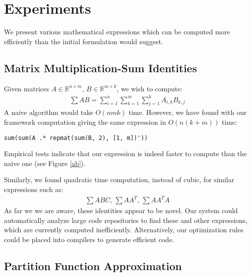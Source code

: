 
\vspace{-2mm}
\section{Experiments}
\vspace{-2mm}

We present various mathematical expressions which can be computed more efficiently
than the initial formulation would suggest. 

\vspace{-2mm}
\subsection{Matrix Multiplication-Sum Identities}

Given matrices $A \in \mathbb{R}^{n \times m}$, $B \in \mathbb{R}^{m
  \times k}$, we wish to compute:
\vspace{-2mm}
\begin{gather*}
\sum AB = \sum_{i = 1}^n \sum_{k = 1}^m \sum_{j = 1}^k A_{i, k} B_{k, j} 
\end{gather*}
A naive algorithm would take $O(nmk)$ time. However, we have found with our framework 
computation giving the same expression in $O(n(k + m))$ time:
\vspace{-3mm}
\begin{lstlisting}
sum(sum(A .* repmat(sum(B, 2), [1, m])'))
\end{lstlisting}
\vspace{-2mm}
 Empirical tests indicate that our expression is indeed faster to
compute than the naive one (see Figure \ref{ab}).

Similarly, we found quadratic time computation, instead of cubic, for
similar expressions such as: 
\begin{align*}
	\sum ABC\text{, }\sum AA^T\text{, }\sum AA^TA
\end{align*}
As far we we are aware, these identities appear to be novel. Our
system could automatically analyze large code repositories to find
these and other expressions, which are currently computed
inefficiently. Alternatively, our optimization rules could be placed
into compilers to generate efficient code.

\subsection{Partition Function Approximation}


